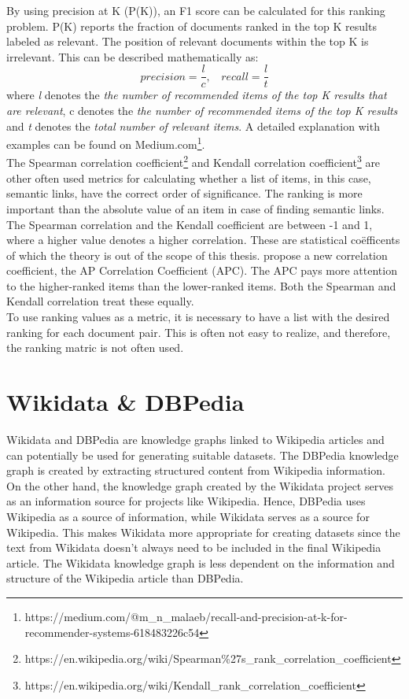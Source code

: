 By using precision at K (P(K)), \citep{Agichtein2006} an F1 score can be calculated for this ranking problem. P(K) reports the fraction of documents ranked in the top K results labeled as relevant. The position of relevant documents within the top K is irrelevant. This can be described mathematically as:
$$precision = \frac{l}{c},\ \ \ \ recall = \frac{l}{t}$$ where \textit{l} denotes the \textit{the number of recommended items of the top K results that are relevant}, {c} denotes the \textit{the number of recommended items of the top K results} and \textit{t} denotes the \textit{total number of relevant items}. A detailed explanation with examples can be found on Medium.com\footnote{https://medium.com/@m\_n\_malaeb/recall-and-precision-at-k-for-recommender-systems-618483226c54}.\\

The Spearman correlation coefficient\footnote{https://en.wikipedia.org/wiki/Spearman\%27s\_rank\_correlation\_coefficient}
 and Kendall correlation coefficient\footnote{https://en.wikipedia.org/wiki/Kendall\_rank\_correlation\_coefficient} are other often used metrics for calculating whether a list of items, in this case, semantic links, have the correct order of significance. The ranking is more important than the absolute value of an item in case of finding semantic links. The Spearman correlation and the Kendall coefficient are between -1 and 1, where a higher value denotes a higher correlation. These are statistical coëfficents of which the theory is out of the scope of this thesis. \citet{APCCoefficient} propose a new correlation coefficient, the AP Correlation Coefficient (APC). The APC pays more attention to the higher-ranked items than the lower-ranked items. Both the Spearman and Kendall correlation treat these equally.\\

To use ranking values as a metric, it is necessary to have a list with the desired ranking for each document pair. This is often not easy to realize, and therefore, the ranking matric is not often used.


\section{Wikidata \& DBPedia}
\label{sectWikidataDBPedia}

Wikidata \citep{vrandevcic2014Wikidata} and DBPedia \citep{dbpedia} are knowledge graphs linked to Wikipedia articles and can potentially be used for generating suitable datasets. The DBPedia knowledge graph is created by extracting structured content from Wikipedia information. On the other hand, the knowledge graph created by the Wikidata project serves as an information source for projects like Wikipedia. Hence, DBPedia uses Wikipedia as a source of information, while Wikidata serves as a source for Wikipedia. This makes Wikidata more appropriate for creating datasets since the text from Wikidata doesn't always need to be included in the final Wikipedia article. The Wikidata knowledge graph is less dependent on the information and structure of the Wikipedia article than DBPedia.\\

